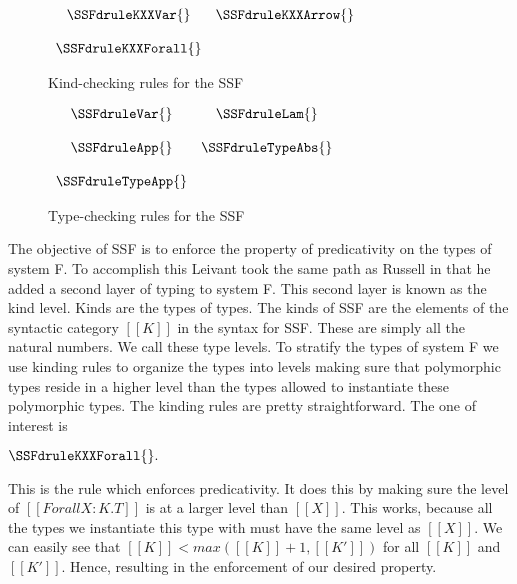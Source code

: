 \begin{figure}
  \begin{center}
    \begin{math}
      \begin{array}{ccc}
        \SSFdruleKXXVar{} & \SSFdruleKXXArrow{}\\
        & \\
        \SSFdruleKXXForall{} 
      \end{array}
    \end{math}
  \end{center}
  \caption{Kind-checking rules for the SSF}
  \label{fig:SSF_kinding}
\end{figure}
\begin{figure}
  \begin{center}
    \begin{math}
      \begin{array}{ccc}
        \SSFdruleVar{} & \SSFdruleLam{}\\
        & \\
        \SSFdruleApp{} & \SSFdruleTypeAbs{}\\
        & \\
        \SSFdruleTypeApp{}
      \end{array}
    \end{math}
  \end{center}
  \caption{Type-checking rules for the SSF}
  \label{fig:SSF_typing}
\end{figure}
The objective of SSF is to enforce the property of predicativity on
the types of system F.  To accomplish this Leivant took the same path
as Russell in that he added a second layer of typing to system F. This
second layer is known as the kind level.  Kinds are the types of
types.  The kinds of SSF are the elements of the syntactic category
$[[K]]$ in the syntax for SSF.  These are simply all the natural
numbers.  We call these type levels.  To stratify the types of system
F we use kinding rules to organize the types into levels making sure
that polymorphic types reside in a higher level than the types allowed
to instantiate these polymorphic types.  The kinding rules are pretty
straightforward. The one of interest is
\begin{center}
  \begin{math}
    \SSFdruleKXXForall{}.
  \end{math}
\end{center}
This is the rule which enforces predicativity. It does this by making
sure the level of $[[Forall X:K.T]]$ is at a larger level than
$[[X]]$.  This works, because all the types we instantiate this type
with must have the same level as $[[X]]$. We can easily see that
$[[K]] < max([[K]]+1,[[K']])$ for all $[[K]]$ and $[[K']]$.  Hence,
resulting in the enforcement of our desired property.

